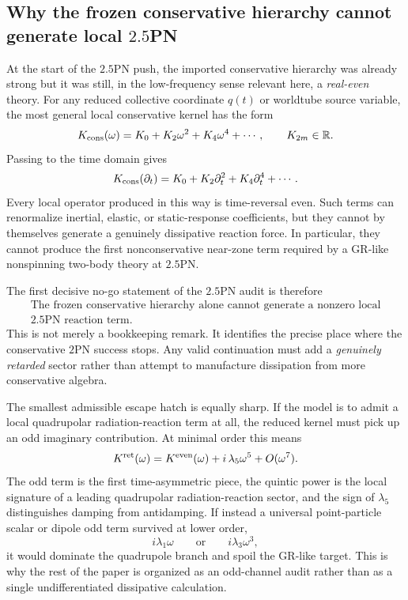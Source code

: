 \documentclass[11pt]{article}
\begin{document}
\subsection{Why the frozen conservative hierarchy cannot generate local \texorpdfstring{$2.5$}{2.5}PN}
\label{sec:benchmark-framework-conservative-nogo}

At the start of the $2.5$PN push, the imported conservative hierarchy was already
strong but it was still, in the low-frequency sense relevant here, a
\emph{real-even} theory.  For any reduced collective coordinate $q(t)$ or
worldtube source variable, the most general local conservative kernel has the form
\[
K_{\rm cons}(\omega)
=
K_0 + K_2\omega^2 + K_4\omega^4 + \cdots,
\qquad
K_{2m}\in\mathbb R.
\]
Passing to the time domain gives
\[
K_{\rm cons}(\partial_t)
=
K_0 + K_2\partial_t^2 + K_4\partial_t^4 + \cdots.
\]
Every local operator produced in this way is time-reversal even.  Such terms can
renormalize inertial, elastic, or static-response coefficients, but they cannot
by themselves generate a genuinely dissipative reaction force.  In particular,
they cannot produce the first nonconservative near-zone term required by a
GR-like nonspinning two-body theory at $2.5$PN.

The first decisive no-go statement of the $2.5$PN audit is therefore
\[
\boxed{\begin{gathered}
\text{The frozen conservative hierarchy alone cannot generate a nonzero local}\\
2.5\text{PN reaction term.}
\end{gathered}}
\]
This is not merely a bookkeeping remark.  It identifies the precise place where
the conservative $2$PN success stops.  Any valid continuation must add a
\emph{genuinely retarded} sector rather than attempt to manufacture dissipation
from more conservative algebra.

The smallest admissible escape hatch is equally sharp.  If the model is to admit
a local quadrupolar radiation-reaction term at all, the reduced kernel must pick
up an odd imaginary contribution.  At minimal order this means
\[
K^{\rm ret}(\omega)
=
K^{\rm even}(\omega) + i\,\lambda_5\omega^5 + O(\omega^7).
\]
The odd term is the first time-asymmetric piece, the quintic power is the local
signature of a leading quadrupolar radiation-reaction sector, and the sign of
$\lambda_5$ distinguishes damping from antidamping.  If instead a universal
point-particle scalar or dipole odd term survived at lower order,
\[
i\lambda_1\omega
\qquad\text{or}\qquad
 i\lambda_3\omega^3,
\]
it would dominate the quadrupole branch and spoil the GR-like target.  This is
why the rest of the paper is organized as an odd-channel audit rather than as a
single undifferentiated dissipative calculation.
\end{document}
